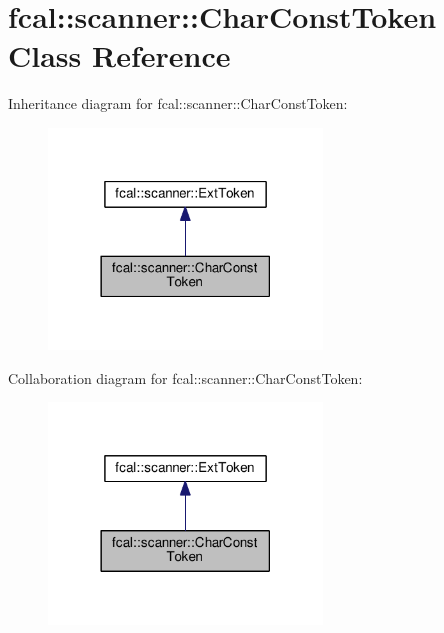 \hypertarget{classfcal_1_1scanner_1_1CharConstToken}{}\section{fcal\+:\+:scanner\+:\+:Char\+Const\+Token Class Reference}
\label{classfcal_1_1scanner_1_1CharConstToken}


Inheritance diagram for fcal\+:\+:scanner\+:\+:Char\+Const\+Token\+:\nopagebreak
\begin{figure}[H]
\begin{center}
\leavevmode
\includegraphics[width=206pt]{classfcal_1_1scanner_1_1CharConstToken__inherit__graph}
\end{center}
\end{figure}


Collaboration diagram for fcal\+:\+:scanner\+:\+:Char\+Const\+Token\+:\nopagebreak
\begin{figure}[H]
\begin{center}
\leavevmode
\includegraphics[width=206pt]{classfcal_1_1scanner_1_1CharConstToken__coll__graph}
\end{center}
\end{figure}
